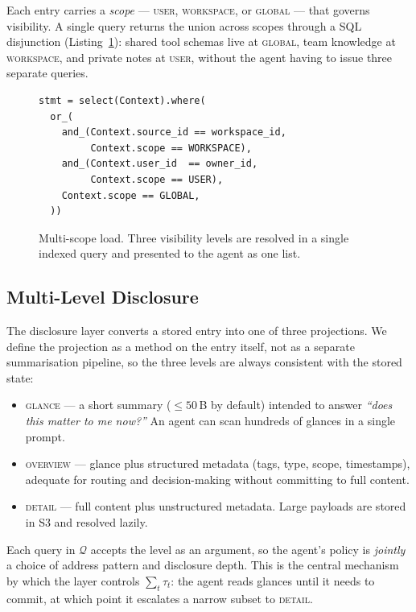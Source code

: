 Each entry carries a \emph{scope} --- \textsc{user},
\textsc{workspace}, or \textsc{global} --- that governs visibility.
A single query returns the union across scopes through a SQL
disjunction (Listing~\ref{lst:scope-load}):
shared tool schemas live at \textsc{global}, team knowledge at
\textsc{workspace}, and private notes at \textsc{user}, without the
agent having to issue three separate queries.

\begin{figure}[t]
\small
\begin{verbatim}
stmt = select(Context).where(
  or_(
    and_(Context.source_id == workspace_id,
         Context.scope == WORKSPACE),
    and_(Context.user_id  == owner_id,
         Context.scope == USER),
    Context.scope == GLOBAL,
  ))
\end{verbatim}
\caption{Multi-scope load. Three visibility levels are resolved in a
single indexed query and presented to the agent as one list.}
\label{lst:scope-load}
\end{figure}

\subsection{Multi-Level Disclosure}
\label{sec:component_b}

The disclosure layer converts a stored entry into one of three
projections. We define the projection as a method on the entry
itself, not as a separate summarisation pipeline, so the three levels
are always consistent with the stored state:
\begin{itemize}
    \item \textsc{glance} --- a short summary ($\leq 50$\,B by
    default) intended to answer \emph{``does this matter to me now?''}
    An agent can scan hundreds of glances in a single prompt.
    \item \textsc{overview} --- glance plus structured metadata
    (tags, type, scope, timestamps), adequate for routing and
    decision-making without committing to full content.
    \item \textsc{detail} --- full content plus unstructured metadata.
    Large payloads are stored in S3 and resolved lazily.
\end{itemize}
Each query in $\mathcal{Q}$ accepts the level as an argument, so the
agent's policy is \emph{jointly} a choice of address pattern and
disclosure depth. This is the central mechanism by which the layer
controls $\sum_t \tau_t$: the agent reads glances until it needs to
commit, at which point it escalates a narrow subset to \textsc{detail}.

